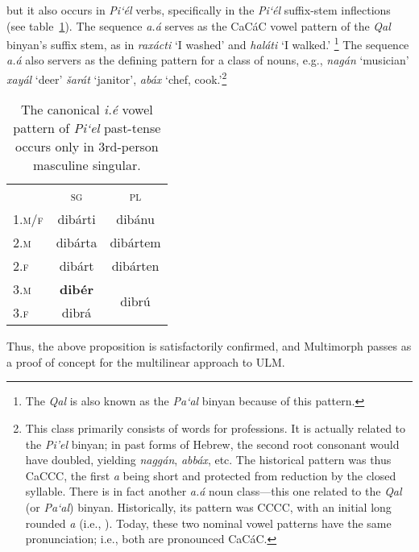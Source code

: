  but it also occurs in \textit{Pi`\'{e}l} verbs, specifically in the \textit{Pi`\'{e}l} suffix-stem inflections (see table~\ref{tab:piel-paradigm}).
The sequence \textit{a.\'{a}} serves as the CaC\'{a}C vowel pattern of the \textit{Qal} 
binyan's suffix stem, as in \textit{rax\'{a}cti} `I washed' and \textit{hal\'{a}ti} `I walked.'
\footnote{The \textit{Qal} is also known as the \textit{\textit{Pa`al}} binyan because
of this pattern.}
The sequence \textit{a.\'{a}} also servers as the defining pattern for a class of nouns, e.g., \textit{nag\'{a}n} `musician'  \textit{xay\'{a}l} `deer' \textit{\v{s}ar\'{a}t} `janitor', \textit{ab\'{a}x} `chef, cook.'\footnote{This class primarily consists of words for professions. It is actually related to the \textit{Pi'el} binyan; in past forms of Hebrew, the second root consonant would have doubled, yielding \textit{nagg\'{a}n}, \textit{abb\'{a}x}, etc. The historical pattern was thus CaCCC, the first \textit{a} being short and protected from reduction by the closed syllable.   There is in fact another \textit{a.\'{a}} noun class---this one related to the \textit{Qal} (or \textit{Pa`al}) binyan. Historically, its pattern was CCCC, with an initial long rounded \textit{a} (i.e., ). Today, these two nominal vowel patterns have the same pronunciation; i.e., both are pronounced CaC\'{a}C.}

\begin{table}[t]
\centering
\setlength{\extrarowheight}{6pt}
\begin{tabular}{lcc}
\toprule
& \textsc{sg} & \textsc{pl} \\
\cmidrule{2-3}
\textsc{1.m/f} & dib\'{a}rti &  dib\'{a}nu \\
\textsc{2.m} & dib\'{a}rta & dib\'{a}rtem \\
\textsc{2.f} & dib\'{a}rt & dib\'{a}rten \\
\textsc{3.m} & \textbf{dib\'{e}r} & \multirow{2}{*}{dibr\'{u}} \\
\textsc{3.f} &  dibr\'{a} &  \\
 \bottomrule
\end{tabular}
\label{tab:piel-paradigm}
\caption{The canonical \textit{i.\'e} vowel pattern of \textit{Pi`el} past-tense occurs only in 3rd-person masculine singular.}
\end{table}

Thus, the above proposition is satisfactorily confirmed, and Multimorph passes as a proof of concept for the multilinear approach to ULM.

